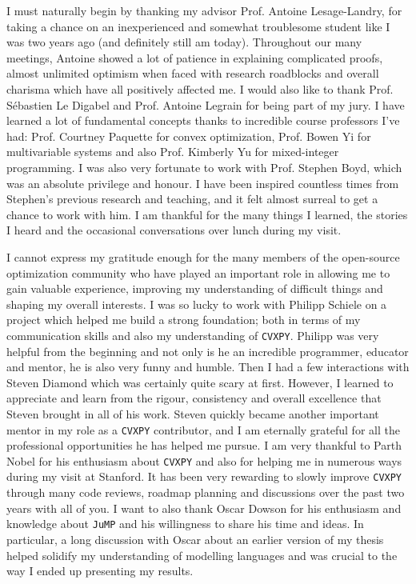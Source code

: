 I must naturally begin by thanking my advisor Prof. Antoine Lesage-Landry,
for taking a chance on an inexperienced and somewhat troublesome student like I was
two years ago (and definitely still am today).
Throughout our many meetings, Antoine showed a lot of patience in explaining
complicated proofs, almost unlimited optimism when faced with research roadblocks
and overall charisma which have all positively affected me.
I would also like to thank Prof. Sébastien Le
Digabel and Prof. Antoine Legrain for being part of my jury.
I have learned a lot of fundamental concepts thanks to incredible course professors
I've had: Prof. Courtney Paquette for convex optimization,
Prof. Bowen Yi for multivariable systems and also Prof. Kimberly Yu for mixed-integer
programming.
I was also very fortunate to work with Prof. Stephen Boyd, which
was an absolute privilege and honour. I have been inspired countless times from
Stephen's previous research and teaching, and it felt almost surreal to get a chance
to work with him. I am thankful for the many things I learned, the stories I heard
and the occasional conversations over lunch during my visit.

I cannot express my gratitude enough for the many members of the open-source optimization
community who have played an important role in allowing me to gain valuable experience,
improving my understanding of difficult things and shaping my overall interests.
I was so lucky to work with Philipp Schiele on a project which
helped me build a strong foundation; both in terms of my communication skills
and also my understanding of \texttt{CVXPY}. Philipp was
very helpful from the beginning and not only is he an incredible programmer,
educator and mentor, he is also very funny and humble. Then I had a few interactions
with Steven Diamond which was certainly quite scary at first.
However, I learned to appreciate and learn from the rigour, consistency
and overall excellence that Steven brought in all of his work. Steven quickly
became another important mentor in my role as a \texttt{CVXPY} contributor,
and I am eternally grateful for all the professional opportunities he has
helped me pursue. I am very thankful to Parth Nobel for his enthusiasm
about \texttt{CVXPY} and also for helping me in numerous ways during my visit
at Stanford. It has been very rewarding to slowly improve \texttt{CVXPY} 
through many code reviews, roadmap planning and discussions over
the past two years with all of you.
I want to also thank Oscar Dowson for his enthusiasm
and knowledge about \texttt{JuMP} and his willingness to share his time
and ideas. In particular, a long discussion with Oscar about an earlier version of
my thesis helped solidify my understanding of modelling languages and was crucial
to the way I ended up presenting my results.


